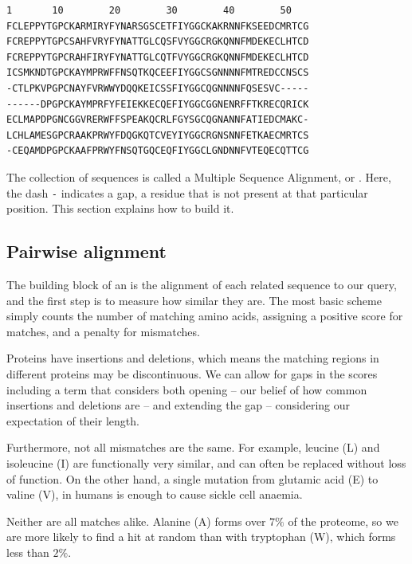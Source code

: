 \begin{center}
\sidenote{\phantom{x}}
\sidenote{\phantom{x}}
\sidenote{\phantom{x}}
\begin{Verbatim}[fontsize=\small, xleftmargin=4em]
1       10        20        30        40        50   
FCLEPPYTGPCKARMIRYFYNARSGSCETFIYGGCKAKRNNFKSEEDCMRTCG
FCREPPYTGPCSAHFVRYFYNATTGLCQSFVYGGCRGKQNNFMDEKECLHTCD
FCREPPYTGPCRAHFIRYFYNATTGLCQTFVYGGCRGKQNNFMDEKECLHTCD
ICSMKNDTGPCKAYMPRWFFNSQTKQCEEFIYGGCSGNNNNFMTREDCCNSCS
-CTLPKVPGPCNAYFVRWWYDQQKEICSSFIYGGCQGNNNNFQSESVC-----
------DPGPCKAYMPRFYFEIEKKECQEFIYGGCGGNENRFFTKRECQRICK
ECLMAPDPGNCGGVRERWFFSPEAKQCRLFGYSGCQGNANNFATIEDCMAKC-
LCHLAMESGPCRAAKPRWYFDQGKQTCVEYIYGGCRGNSNNFETKAECMRTCS
-CEQAMDPGPCKAAFPRWYFNSQTGQCEQFIYGGCLGNDNNFVTEQECQTTCG
\end{Verbatim}
\end{center}

The collection of sequences is called a Multiple Sequence Alignment, or \MSA.
Here, the dash \texttt{-} indicates a gap, a residue that is not present at that particular position.
This section explains how to build it.


\subsection{Pairwise alignment}
The building block of an \MSA{} is the alignment of each related sequence to our query, and the first step is to measure how similar they are.
The most basic scheme simply counts the number of matching amino acids, assigning a positive score for matches, and a penalty for mismatches. 

Proteins have insertions and deletions, which means the matching regions in different proteins may be discontinuous.  
We can allow for gaps in the scores including a term that considers both opening -- our belief of how common insertions and deletions are -- and extending the gap -- considering our expectation of their length.

Furthermore, not all mismatches are the same.
For example, leucine (L) and isoleucine (I) are functionally very similar, and can often be replaced without loss of function.
On the other hand, a single mutation from glutamic acid (E) to valine (V), in humans is enough to cause sickle cell anaemia.

Neither are all matches alike.
Alanine (A) forms over $7\%$ of the proteome, so we are more likely to find a hit at random than with tryptophan (W), which forms less than $2\%$.

